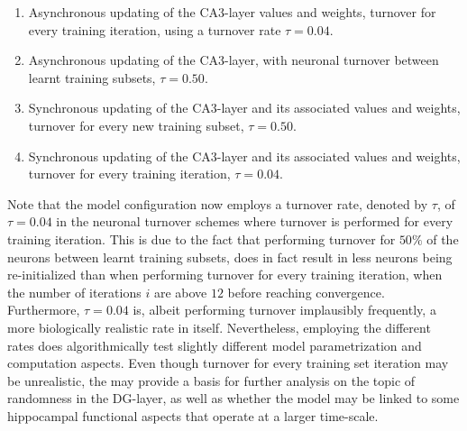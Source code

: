\begin{enumerate}  
\item Asynchronous updating of the CA3-layer values and weights, turnover for every training iteration, using a turnover rate $\tau=0.04$.
\item Asynchronous updating of the CA3-layer, with neuronal turnover between learnt training subsets, $\tau=0.50$.
\item Synchronous updating of the CA3-layer and its associated values and weights, turnover for every new training subset, $\tau=0.50$.
\item Synchronous updating of the CA3-layer and its associated values and weights, turnover for every training iteration, $\tau=0.04$.
\end{enumerate}

Note that the model configuration now employs a turnover rate, denoted by $\tau$, of $\tau=0.04$ in the neuronal turnover schemes where turnover is performed for every training iteration. This is due to the fact that performing turnover for  $50 \%$ of the neurons between learnt training subsets, does in fact result in less neurons being re-initialized than when performing turnover for every training iteration, when the number of iterations $i$ are above $12$ before reaching convergence. Furthermore, $\tau=0.04$ is, albeit performing turnover implausibly frequently, a more biologically realistic rate in itself. 
Nevertheless, employing the different rates does algorithmically test slightly different model parametrization and computation aspects. Even though turnover for every training set iteration may be unrealistic, the may provide a basis for further analysis on the topic of randomness in the DG-layer, as well as whether the model may be linked to some hippocampal functional aspects that operate at a larger time-scale.


